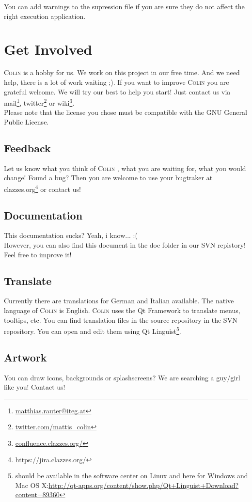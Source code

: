 \documentclass[a4paper,11pt]{report}
\newcommand{\Colin}[0]{\textsc{Colin }}
\begin{document}
You can add warnings to the supression file if you are sure they do not affect the right execution application.



\chapter{Get Involved}
\label{cha:involved}

\Colin is a hobby for us. We work on this project in our free time. And we need help, there is a lot of work waiting ;). If you want to improve \Colin you are grateful welcome. We will try our best to help you start! Just contact us via mail\footnote{\href{mailto:matthias.rauter@iteg.at}{matthias.rauter@iteg.at}}, twitter\footnote{\url{twitter.com/mattis_colin}} or wiki\footnote{\url{confluence.clazzes.org/}}.\\
Please note that the license you chose must be compatible with the GNU General Public License.


\section{Feedback}
Let us know what you think of \Colin, what you are waiting for, what you would change! Found a bug?
Then you are welcome to use your bugtraker at clazzes.org\footnote{\url{https://jira.clazzes.org/}} or contact us!

\section{Documentation}
This documentation sucks? Yeah, i know... :(\\
However, you can also find this document in the doc folder in our SVN repistory! Feel free to improve it!

\section{Translate}
Currently there are translations for German and Italian available. The native language of \Colin is English.
\Colin uses the Qt Framework to translate menus, tooltips, etc. You can find translation files in the source repository in the SVN repository. You can open and edit them using Qt Linguist\footnote{should be available in the software center on Linux and here for Windows and Mac OS X:\url{http://qt-apps.org/content/show.php/Qt+Linguist+Download?content=89360}}.

\section{Artwork}
You can draw icons, backgrounds or splashscreens? We are searching a guy/girl like you! Contact us!
\end{document}
